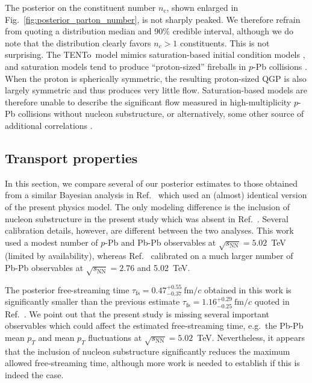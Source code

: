 \documentclass[aps,prc,reprint,amsmath,nofootinbib]{revtex4-1}
\newcommand{\trento}{T\raisebox{-0.5ex}{R}ENTo}
\newcommand{\sqrts}{\sqrt{s_\mathrm{NN}}}
\newcommand{\fmc}{\ensuremath{\text{fm}/c}}
\newcommand{\taufs}{\tau_\text{fs}}
\begin{document}
The posterior on the constituent number $n_c$, shown enlarged in Fig.~\ref{fig:posterior_parton_number}, is not sharply peaked.
We therefore refrain from quoting a distribution median and 90\% credible interval, although we do note that the distribution clearly favors $n_c > 1$ constituents.
This is not surprising.
The \trento\ model mimics saturation-based initial condition models \cite{Bernhard:2016tnd}, and saturation models tend to produce ``proton-sized'' fireballs in $p$-Pb collisions \cite{Bzdak:2013zma}.
When the proton is spherically symmetric, the resulting proton-sized QGP is also largely symmetric and thus produces very little flow.
Saturation-based models are therefore unable to describe the significant flow measured in high-multiplicity $p$-Pb collisions without nucleon substructure, or alternatively, some other source of additional correlations \cite{Schenke:2017bog}.

\subsection{Transport properties}

In this section, we compare several of our posterior estimates to those obtained from a similar Bayesian analysis in Ref.~\cite{Bernhard:2018hnz} which used an (almost) identical version of the present physics model.
The only modeling difference is the inclusion of nucleon substructure in the present study which was absent in Ref.~\cite{Bernhard:2018hnz}.
Several calibration details, however, are different between the two analyses.
This work used a modest number of $p$-Pb and Pb-Pb observables at $\sqrts=5.02$~TeV (limited by availability), whereas Ref.~\cite{Bernhard:2018hnz} calibrated on a much larger number of Pb-Pb observables at $\sqrts=2.76$ and 5.02~TeV.

The posterior free-streaming time $\taufs=0.47_{-0.37}^{+0.55}~\fmc$ obtained in this work is significantly smaller than the previous estimate $\taufs=1.16_{-0.25}^{+0.29}\ \fmc$ quoted in Ref.~\cite{Bernhard:2018hnz}.
We point out that the present study is missing several important observables which could affect the estimated free-streaming time, e.g.\ the Pb-Pb mean $p_T$ and mean $p_T$ fluctuations at $\sqrts=5.02$~TeV.
Nevertheless, it appears that the inclusion of nucleon substructure significantly reduces the maximum allowed free-streaming time, although more work is needed to establish if this is indeed the case.
\end{document}
